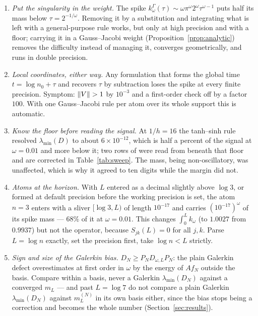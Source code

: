 \begin{enumerate}
\item \emph{Put the singularity in the weight.} The spike
$k^\Gamma_\omega(\tau)\sim\omega\pi^\omega2^\omega\tau^{\omega-1}$ puts half its
mass below $\tau=2^{-1/\omega}$. Removing it by a substitution and integrating
what is left with a general-purpose rule works, but only at high precision and
with a floor; carrying it in a Gauss--Jacobi weight
(Proposition~\ref{prop:analytic}) removes the difficulty instead of managing
it, converges geometrically, and runs in double precision.
\item \emph{Local coordinates, either way.} Any formulation that forms the
global time $t=\log n_0+\tau$ and recovers $\tau$ by subtraction loses the spike
at every finite precision. Symptom: $\lVert V\rVert>1$ by $10^{-3}$ and a first-order
check off by a factor $100$. With one Gauss--Jacobi rule per atom over its whole
support this is automatic.
\item \emph{Know the floor before reading the signal.} At $1/h=16$ the
tanh--sinh rule resolved $\lambda_{\min}(D)$ to about $6\times10^{-12}$, which is
half a percent of the signal at $\omega=0.01$ and more below it; two rows of
\cite[Table~3.1]{ContractionNote} were read from beneath that floor and are
corrected in Table~\ref{tab:sweep}. The mass, being non-oscillatory, was
unaffected, which is why it agreed to ten digits while the margin did not.
\item \emph{Atoms at the horizon.} With $L$ entered as a decimal slightly above
$\log3$, or formed at default precision before the working precision is set, the
atom $n=3$ enters with a sliver $[\log3,L)$ of length $10^{-17}$ and carries
$(10^{-17})^\omega$ of its spike mass --- $68\%$ of it at $\omega=0.01$. This
changes $\int_0^Lk_\omega$ (to $1.0027$ from $0.9937$) but not the operator,
because $S_{jk}(L)=0$ for all $j,k$. Parse $L=\log n$ exactly, set the precision
first, take $\log n<L$ strictly.
\item \emph{Sign and size of the Galerkin bias.} $D_N\geq P_ND_{\omega,L}P_N$:
the plain Galerkin defect overestimates at first order in $\omega$ by the energy
of $Af_N$ outside the basis. Compare within a basis, never a Galerkin
$\lambda_{\min}(D_N)$ against a converged $m_L$ --- and past $L=\log7$ do not
compare a plain Galerkin $\lambda_{\min}(D_N)$ against $m_L^{(N)}$ in its own
basis either, since the bias stops being a correction and becomes the whole
number (Section~\ref{sec:results}).
\end{enumerate}
